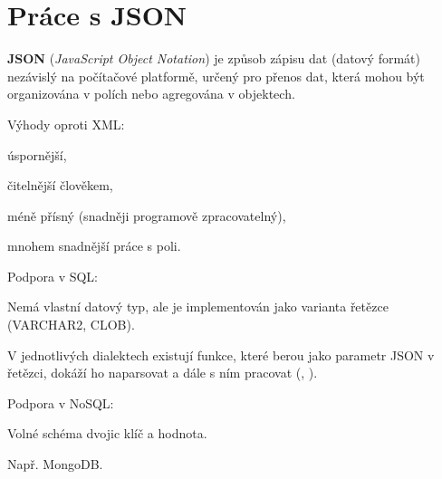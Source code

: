 
\section{Práce s JSON}

\begin{compactitem}
    \item \textbf{JSON} (\textit{JavaScript Object Notation}) je způsob zápisu dat (datový formát) nezávislý na počítačové platformě, určený pro přenos dat, která mohou být organizována v polích nebo agregována v objektech.

    \item Výhody oproti XML: \begin{compactitem}
        \item úspornější,
        \item čitelnější člověkem,
        \item méně přísný (snadněji programově zpracovatelný),
        \item mnohem snadnější práce s poli.
    \end{compactitem}

    \item Podpora v SQL: \begin{compactitem}
        \item Nemá vlastní datový typ, ale je implementován jako varianta řetězce (VARCHAR2, CLOB).
        \item V jednotlivých dialektech existují funkce, které berou jako parametr JSON v řetězci, dokáží ho naparsovat a dále s ním pracovat (, ).
    \end{compactitem}

    \item Podpora v NoSQL: \begin{compactitem}
        \item Volné schéma dvojic klíč a hodnota.
        \item Např. MongoDB.
    \end{compactitem}
\end{compactitem}
